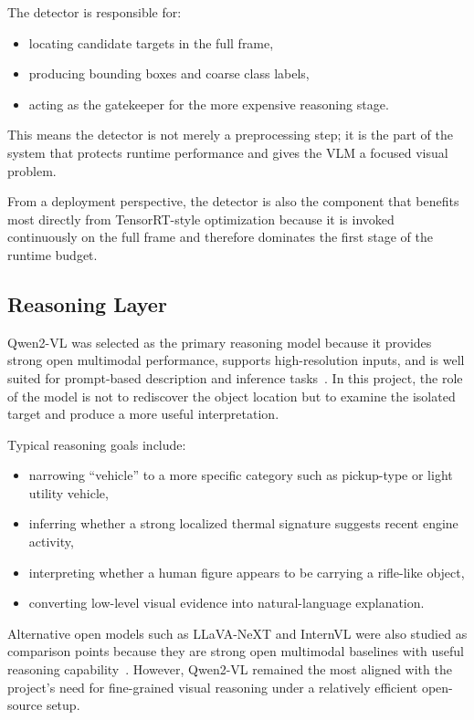 The detector is responsible for:

\begin{itemize}[nosep]
  \item locating candidate targets in the full frame,
  \item producing bounding boxes and coarse class labels,
  \item acting as the gatekeeper for the more expensive reasoning stage.
\end{itemize}

This means the detector is not merely a preprocessing step; it is the part of the system that
protects runtime performance and gives the VLM a focused visual problem.

From a deployment perspective, the detector is also the component that benefits most directly
from TensorRT-style optimization because it is invoked continuously on the full frame and
therefore dominates the first stage of the runtime budget.

\subsection{Reasoning Layer}

Qwen2-VL was selected as the primary reasoning model because it provides strong open
multimodal performance, supports high-resolution inputs, and is well suited for prompt-based
description and inference tasks~\cite{qwen2vl}. In this project, the role of the model is not
to rediscover the object location but to examine the isolated target and produce a more useful
interpretation.

Typical reasoning goals include:

\begin{itemize}[nosep]
  \item narrowing ``vehicle'' to a more specific category such as pickup-type or light utility
    vehicle,
  \item inferring whether a strong localized thermal signature suggests recent engine activity,
  \item interpreting whether a human figure appears to be carrying a rifle-like object,
  \item converting low-level visual evidence into natural-language explanation.
\end{itemize}

Alternative open models such as LLaVA-NeXT and InternVL were also studied
as comparison points because they are strong open multimodal baselines with useful
reasoning capability~\cite{llavanext,internvl2024}. However, Qwen2-VL remained the most
aligned with the project's need for fine-grained visual reasoning under a relatively efficient
open-source setup.

